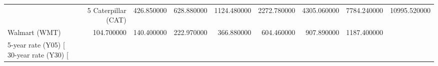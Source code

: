 \begin{tabular}{lrrrrrrr}
\toprule
 & 5%
\midrule
Caterpillar (CAT) & 426.850000 & 628.880000 & 1124.480000 & 2272.780000 & 4305.060000 & 7784.240000 & 10995.520000 \\
Walmart (WMT) & 104.700000 & 140.400000 & 222.970000 & 366.880000 & 604.460000 & 907.890000 & 1187.400000 \\
5-year rate (Y05) [%
30-year rate (Y30) [%
\bottomrule
\end{tabular}
